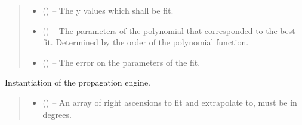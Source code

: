 \documentclass[letterpaper,11pt,english]{sphinxmanual}
\begin{document}
\begin{savenotes}
\begin{fulllineitems}
\begin{savenotes}
\begin{fulllineitems}
\begin{quote}
\begin{description}
\begin{itemize}
\item {} 
\sphinxAtStartPar
{} () – The y values which shall be fit.

\end{itemize}

\sphinxAtStartPar
\begin{itemize}
\item {} 
\sphinxAtStartPar
{} () – The parameters of the polynomial that corresponded to the best fit.
Determined by the order of the polynomial function.

\item {} 
\sphinxAtStartPar
{} () – The error on the parameters of the fit.

\end{itemize}


\end{description}\end{quote}

\end{fulllineitems}\end{savenotes}


\begin{savenotes}\begin{fulllineitems}
\label{\detokenize{code/opihiexarata.propagate.polynomial:opihiexarata.propagate.polynomial.QuadraticPropagationEngine.__init__}}
\pysigstartsignatures
{}
\pysigstopsignatures
\sphinxAtStartPar
Instantiation of the propagation engine.
\begin{quote}\begin{description}
\begin{itemize}
\item {} 
\sphinxAtStartPar
{} () – An array of right ascensions to fit and extrapolate to, must be in
degrees.


\end{itemize}
\end{description}
\end{quote}
\end{fulllineitems}
\end{savenotes}
\end{fulllineitems}
\end{savenotes}
\end{document}
